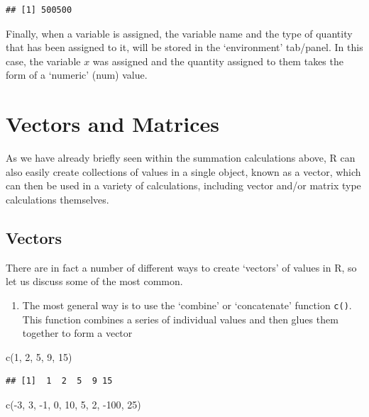 \documentclass[
]{book}
\newenvironment{Shaded}{\begin{snugshade}}{\end{snugshade}}
\newcommand{\DecValTok}[1]{\textcolor[rgb]{0.00,0.00,0.81}{#1}}
\newcommand{\FunctionTok}[1]{\textcolor[rgb]{0.00,0.00,0.00}{#1}}
\newcommand{\NormalTok}[1]{#1}
\newcommand{\SpecialCharTok}[1]{\textcolor[rgb]{0.00,0.00,0.00}{#1}}
\providecommand{\tightlist}{%
  \setlength{\itemsep}{0pt}\setlength{\parskip}{0pt}}
\theoremstyle{definition}
\theoremstyle{definition}
\theoremstyle{definition}
\theoremstyle{definition}
\theoremstyle{remark}
\begin{document}
\begin{verbatim}
## [1] 500500
\end{verbatim}

Finally, when a variable is assigned, the variable name and the type of quantity that has been assigned to it, will be stored in the `environment' tab/panel. In this case, the variable \(x\) was assigned and the quantity assigned to them takes the form of a `numeric' (num) value.

\hypertarget{vectors-and-matrices}{%
\section{Vectors and Matrices}\label{vectors-and-matrices}}

As we have already briefly seen within the summation calculations above, R can also easily create collections of values in a single object, known as a vector, which can then be used in a variety of calculations, including vector and/or matrix type calculations themselves.

\hypertarget{vectors}{%
\subsection{Vectors}\label{vectors}}

There are in fact a number of different ways to create `vectors' of values in R, so let us discuss some of the most common.

\begin{enumerate}
\def\labelenumi{\arabic{enumi}.}
\tightlist
\item
  The most general way is to use the `combine' or `concatenate' function \texttt{c()}. This function combines a series of individual values and then glues them together to form a vector
\end{enumerate}

\begin{Shaded}
\begin{Highlighting}[]
\FunctionTok{c}\NormalTok{(}\DecValTok{1}\NormalTok{, }\DecValTok{2}\NormalTok{, }\DecValTok{5}\NormalTok{, }\DecValTok{9}\NormalTok{, }\DecValTok{15}\NormalTok{)}
\end{Highlighting}
\end{Shaded}

\begin{verbatim}
## [1]  1  2  5  9 15
\end{verbatim}

\begin{Shaded}
\begin{Highlighting}[]
\FunctionTok{c}\NormalTok{(}\SpecialCharTok{{-}}\DecValTok{3}\NormalTok{, }\DecValTok{3}\NormalTok{, }\SpecialCharTok{{-}}\DecValTok{1}\NormalTok{, }\DecValTok{0}\NormalTok{, }\DecValTok{10}\NormalTok{, }\DecValTok{5}\NormalTok{, }\DecValTok{2}\NormalTok{, }\SpecialCharTok{{-}}\DecValTok{100}\NormalTok{, }\DecValTok{25}\NormalTok{)}
\end{Highlighting}
\end{Shaded}
\end{document}
